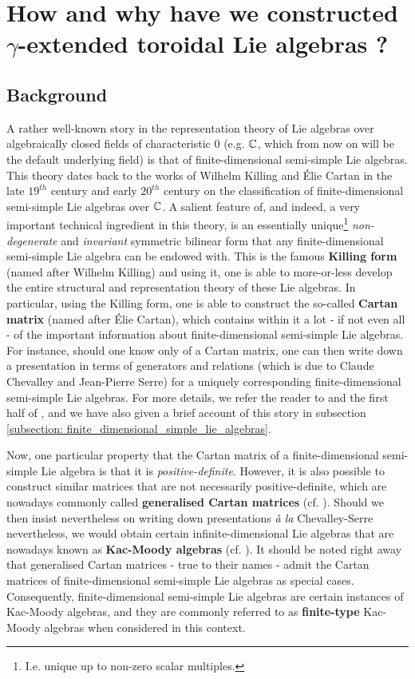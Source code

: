 \section{How and why have we constructed \texorpdfstring{$\gamma$}{}-extended toroidal Lie algebras ?}
    \subsection{Background}
        A rather well-known story in the representation theory of Lie algebras over algebraically closed fields of characteristic $0$ (e.g. $\mathbb{C}$, which from now on will be the default underlying field) is that of finite-dimensional semi-simple Lie algebras. This theory dates back to the works of Wilhelm Killing and \'Elie Cartan in the late $19^{th}$ century and early $20^{th}$ century on the classification of finite-dimensional semi-simple Lie algebras over $\mathbb{C}$. A salient feature of, and indeed, a very important technical ingredient in this theory, is an essentially unique\footnote{I.e. unique up to non-zero scalar multiples.} \textit{non-degenerate} and \textit{invariant} symmetric bilinear form that any finite-dimensional semi-simple Lie algebra can be endowed with. This is the famous \textbf{Killing form} (named after Wilhelm Killing) and using it, one is able to more-or-less develop the entire structural and representation theory of these Lie algebras. In particular, using the Killing form, one is able to construct the so-called \textbf{Cartan matrix} (named after \'Elie Cartan), which contains within it a lot - if not even all - of the important information about finite-dimensional semi-simple Lie algebras. For instance, should one know only of a Cartan matrix, one can then write down a presentation in terms of generators and relations (which is due to Claude Chevalley and Jean-Pierre Serre) for a uniquely corresponding finite-dimensional semi-simple Lie algebras. For more details, we refer the reader to \cite{humphreys_lie_algebras} and the first half of \cite{carter_affine_lie_algebras}, and we have also given a brief account of this story in subsection \ref{subsection: finite_dimensional_simple_lie_algebras}.

        Now, one particular property that the Cartan matrix of a finite-dimensional semi-simple Lie algebra is that it is \textit{positive-definite}. However, it is also possible to construct similar matrices that are not necessarily positive-definite, which are nowadays commonly called \textbf{generalised Cartan matrices} (cf. \cite[Chapter 1]{kac_infinite_dimensional_lie_algebras}). Should we then insist nevertheless on writing down presentations \textit{\`a la} Chevalley-Serre nevertheless, we would obtain certain infinite-dimensional Lie algebras that are nowadays known as \textbf{Kac-Moody algebras} (cf. \cite[Chapter 1]{kac_infinite_dimensional_lie_algebras}). It should be noted right away that generalised Cartan matrices - true to their names - admit the Cartan matrices of finite-dimensional semi-simple Lie algebras as special cases. Consequently, finite-dimensional semi-simple Lie algebras are certain instances of Kac-Moody algebras, and they are commonly referred to as \textbf{finite-type} Kac-Moody algebras when considered in this context.
        
